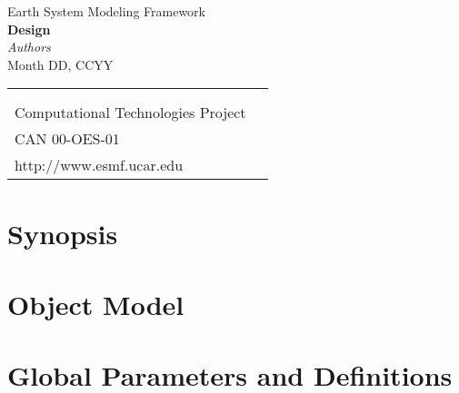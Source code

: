 \documentclass[]{article}
\begin{document}

\begin{titlepage}

\begin{center}
{\Large Earth System Modeling Framework } \\
\vspace{.25in}
{\Large {\bf <Module, Library, Component or Model Name> Design}} \\
\vspace{.25in}
{\large {\it Authors}} \\
\vspace{.25in}
{Month DD, CCYY}
\vspace{.5in}
\end{center}

\begin{latexonly}
\vspace{5.5in}
\begin{tabular}{p{5in}p{.9in}}
\hrulefill \\
\noindent {\bf NASA Earth Science Technology Office} \\
\noindent Computational Technologies Project \\
\noindent CAN 00-OES-01 \\
\noindent http://www.esmf.ucar.edu \\
\end{tabular}
\end{latexonly}

\end{titlepage}

\tableofcontents

\newpage
\section{Synopsis}


%

\section{Object Model}


\section{Global Parameters and Definitions}

\end{document}
